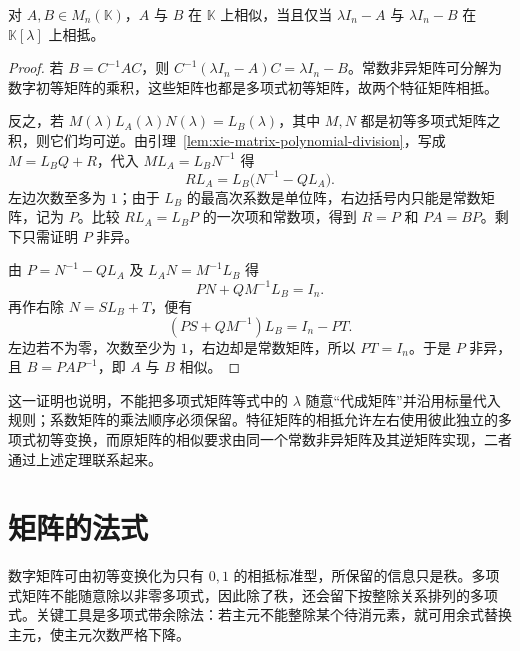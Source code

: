 \begin{theorem}
\label{thm:xie-similarity-characteristic-equivalence}
对 $A,B\in M_n(\mathbb K)$，$A$ 与 $B$ 在 $\mathbb K$ 上相似，当且仅当 $\lambda I_n-A$ 与 $\lambda I_n-B$ 在 $\mathbb K[\lambda]$ 上相抵。
\end{theorem}
\begin{proof}
若 $B=C^{-1}AC$，则 $C^{-1}(\lambda I_n-A)C=\lambda I_n-B$。常数非异矩阵可分解为数字初等矩阵的乘积，这些矩阵也都是多项式初等矩阵，故两个特征矩阵相抵。

反之，若 $M(\lambda)L_A(\lambda)N(\lambda)=L_B(\lambda)$，其中 $M,N$ 都是初等多项式矩阵之积，则它们均可逆。由引理~\ref{lem:xie-matrix-polynomial-division}，写成 $M=L_BQ+R$，代入 $ML_A=L_BN^{-1}$ 得
\[
    RL_A=L_B\bigl(N^{-1}-QL_A\bigr).
\]
左边次数至多为 $1$；由于 $L_B$ 的最高次系数是单位阵，右边括号内只能是常数矩阵，记为 $P$。比较 $RL_A=L_BP$ 的一次项和常数项，得到 $R=P$ 和 $PA=BP$。剩下只需证明 $P$ 非异。

由 $P=N^{-1}-QL_A$ 及 $L_AN=M^{-1}L_B$ 得
\[
    PN+QM^{-1}L_B=I_n.
\]
再作右除 $N=SL_B+T$，便有
\[
    (PS+QM^{-1})L_B=I_n-PT.
\]
左边若不为零，次数至少为 $1$，右边却是常数矩阵，所以 $PT=I_n$。于是 $P$ 非异，且 $B=PAP^{-1}$，即 $A$ 与 $B$ 相似。
\end{proof}

这一证明也说明，不能把多项式矩阵等式中的 $\lambda$ 随意“代成矩阵”并沿用标量代入规则；系数矩阵的乘法顺序必须保留。特征矩阵的相抵允许左右使用彼此独立的多项式初等变换，而原矩阵的相似要求由同一个常数非异矩阵及其逆矩阵实现，二者通过上述定理联系起来。

\section{矩阵的法式}
\label{sec:xie-smith-form}

数字矩阵可由初等变换化为只有 $0,1$ 的相抵标准型，所保留的信息只是秩。多项式矩阵不能随意除以非零多项式，因此除了秩，还会留下按整除关系排列的多项式。关键工具是多项式带余除法：若主元不能整除某个待消元素，就可用余式替换主元，使主元次数严格下降。


